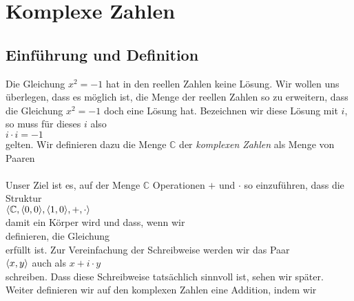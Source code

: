 \chapter{Komplexe Zahlen}

\section{Einf\"{u}hrung und Definition}
Die Gleichung $x^2 = -1$ hat in den reellen Zahlen keine L\"{o}sung.  Wir wollen uns \"{u}berlegen,
dass es m\"{o}glich ist, die Menge der reellen Zahlen so zu erweitern, dass die
Gleichung $x^2 = -1$ doch eine L\"{o}sung hat.  Bezeichnen wir diese L\"{o}sung mit $i$, so muss
f\"{u}r dieses $i$ also
\\[0.2cm]
\hspace*{1.3cm}
$i \cdot i = -1$
\\[0.2cm]
gelten.  Wir definieren dazu die Menge $\mathbb{C}$ der \emph{komplexen Zahlen} als Menge
von Paaren
\\[0.2cm]
\hspace*{1.3cm}
\colorbox{red}{}
\\[0.2cm]
Unser Ziel ist es, auf der Menge $\mathbb{C}$ Operationen $+$ und $\cdot$ so einzuf\"{u}hren, dass
die Struktur
\\[0.2cm]
\hspace*{1.3cm}
$\langle \mathbb{C}, \pair(0,0), \pair(1,0), +, \cdot \rangle$
\\[0.2cm]
damit ein K\"{o}rper wird und dass, wenn wir 
\\[0.2cm]
\hspace*{1.3cm}
\colorbox{red}{} 
\quad definieren, die Gleichung \quad
\colorbox{red}{}
\\[0.2cm]
erf\"{u}llt
ist.  Zur Vereinfachung der Schreibweise werden wir das Paar 
\\[0.2cm]
\hspace*{1.3cm}
$\pair(x,y)$ \quad auch als \quad $x + i \cdot y$
\\[0.2cm]
schreiben.  Dass diese Schreibweise tats\"{a}chlich sinnvoll ist, sehen wir sp\"{a}ter.
Weiter definieren wir auf den komplexen Zahlen eine Addition, indem wir 
\\[0.2cm]
\hspace*{1.3cm}
